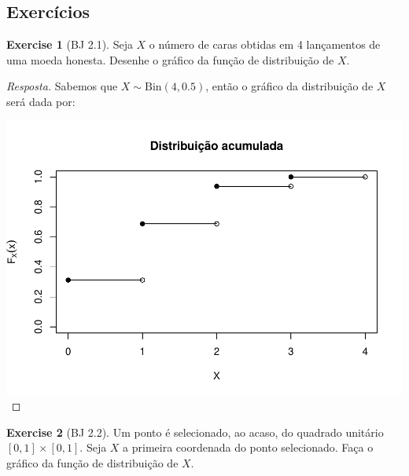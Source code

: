 \documentclass[
]{article}
\theoremstyle{definition}
\theoremstyle{definition}
\theoremstyle{definition}
\newtheorem{exercise}{Exercise}[section]
\theoremstyle{definition}
\theoremstyle{remark}
\begin{document}
\newpage

\hypertarget{exercuxedcios-1}{%
\subsection{Exercícios}\label{exercuxedcios-1}}

\begin{exercise}[BJ 2.1]
Seja \(X\) o número de caras obtidas em 4 lançamentos de uma moeda honesta. Desenhe o gráfico da função de distribuição de \(X\).
\end{exercise}

\begin{proof}[Resposta]
Sabemos que \(X \sim \mathrm{Bin}(4,0.5)\), então o gráfico da distribuição de \(X\) será dada por:

\includegraphics{_main_files/figure-latex/distacummoeda-1.pdf}
\end{proof}

\begin{exercise}[BJ 2.2]
Um ponto é selecionado, ao acaso, do quadrado unitário \([0,1] \times [0,1]\). Seja \(X\) a primeira coordenada do ponto selecionado. Faça o gráfico da função de distribuição de \(X\).
\end{exercise}
\end{document}
